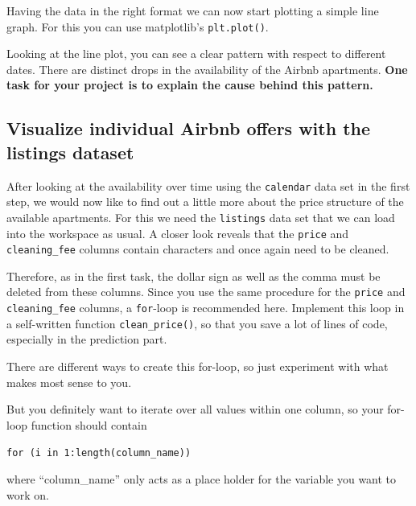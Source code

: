 \documentclass[
  11pt,
]{article}
\newenvironment{tips}[1]
  {
  \begin{itemize}
  \footnotesize
  \renewcommand{\labelitemi}{
    \raisebox{-.7\height}[0pt][0pt]{
      {\setkeys{Gin}{width=3em,keepaspectratio}
        \texttt{[image: images/\#1.png]}}
    }
  }
  \setlength{\fboxsep}{1em}
  \begin{rbox}
  \item
  }
  {
  \end{rbox}
  \end{itemize}
  }
\newenvironment{tipsp}[1]
  {
  \begin{itemize}
  \footnotesize
  \renewcommand{\labelitemi}{
    \raisebox{-.7\height}[0pt][0pt]{
      {\setkeys{Gin}{width=3em,keepaspectratio}
        \texttt{[image: images/\#1.png]}}
    }
  }
  \setlength{\fboxsep}{1em}
  \begin{pbox}
  \item
  }
  {
  \end{pbox}
  \end{itemize}
  }
\begin{document}
\begin{tipsp}p

Having the data in the right format we can now start plotting a simple line graph. For this you can use matplotlib's \texttt{plt.plot()}.

\end{tipsp}

Looking at the line plot, you can see a clear pattern with respect to different dates. There are distinct drops in the availability of the Airbnb apartments. \textbf{One task for your project is to explain the cause behind this pattern.}

\hypertarget{visualize-individual-airbnb-offers-with-the-listings-dataset}{%
\subsection{Visualize individual Airbnb offers with the listings dataset}\label{visualize-individual-airbnb-offers-with-the-listings-dataset}}

After looking at the availability over time using the \texttt{calendar} data set in the first step, we would now like to find out a little more about the price structure of the available apartments. For this we need the \texttt{listings} data set that we can load into the workspace as usual. A closer look reveals that the \texttt{price} and \texttt{cleaning\_fee} columns contain characters and once again need to be cleaned.

Therefore, as in the first task, the dollar sign as well as the comma must be deleted from these columns. Since you use the same procedure for the \texttt{price} and \texttt{cleaning\_fee} columns, a \texttt{for}-loop is recommended here. Implement this loop in a self-written function \texttt{clean\_price()}, so that you save a lot of lines of code, especially in the prediction part.

\begin{tips}r

There are different ways to create this for-loop, so just experiment with what makes most sense to you.

But you definitely want to iterate over all values within one column, so your for-loop function should contain

\texttt{for\ (i\ in\ 1:length(column\_name))}

where ``column\_name'' only acts as a place holder for the variable you want to work on.

\end{tips}
\end{document}
